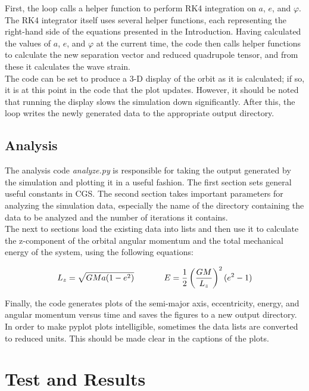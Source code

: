 \documentclass[11pt,letterpaper]{article}
\begin{document}
First, the loop calls a helper function to perform RK4 integration on $a$, $e$, and $\varphi$. The RK4 integrator itself uses several helper functions, each representing the right-hand side of the equations presented in the Introduction. Having calculated the values of $a$, $e$, and $\varphi$ at the current time, the code then calls helper functions to calculate the new separation vector and reduced quadrupole tensor, and from these it calculates the wave strain. \\

The code can be set to produce a 3-D display of the orbit as it is calculated; if so, it is at this point in the code that the plot updates. However, it should be noted that running the display slows the simulation down significantly. After this, the loop writes the newly generated data to the appropriate output directory. 

\subsection{Analysis}

The analysis code \textit{analyze.py} is responsible for taking the output generated by the simulation and plotting it in a useful fashion. The first section sets general useful constants in CGS. The second section takes important parameters for analyzing the simulation data, especially the name of the directory containing the data to be analyzed and the number of iterations it contains. \\

The next to sections load the existing data into lists and then use it to calculate the z-component of the orbital angular momentum and the total mechanical energy of the system, using the following equations:

$$ L_z = \sqrt{GMa (1 - e^2)} \hspace*{.5in} E = \frac{1}{2} \left( \frac{GM}{L_z} \right)^2 (e^2 - 1) $$

Finally, the code generates plots of the semi-major axis, eccentricity, energy, and angular momentum versus time and saves the figures to a new output directory. In order to make pyplot plots intelligible, sometimes the data lists are converted to reduced units. This should be made clear in the captions of the plots.

\section{Test and Results}
\end{document}

